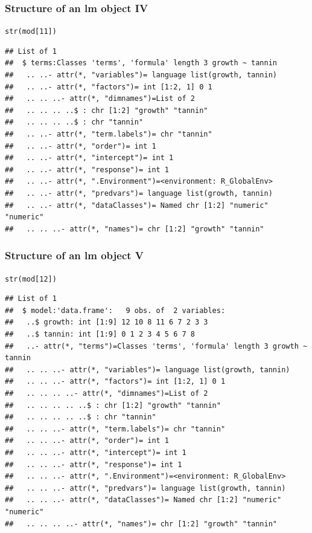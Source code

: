 \documentclass[xcolor=table, xcolor=dvipsnames]{beamer}\usepackage[]{graphicx}\usepackage[]{color}
\makeatletter
\newcommand{\hlnum}[1]{\textcolor[rgb]{0,0,0}{#1}}
\newcommand{\hlstd}[1]{\textcolor[rgb]{0,0,0}{#1}}
\newcommand{\hlkwd}[1]{\textcolor[rgb]{0,0,1}{#1}}
\newenvironment{kframe}{%
 \def\at@end@of@kframe{}%
 \ifinner\ifhmode%
  \def\at@end@of@kframe{\end{minipage}}%
  \begin{minipage}{\columnwidth}%
 \fi\fi%
 \def\FrameCommand##1{\hskip\@totalleftmargin \hskip-\fboxsep
 \colorbox{shadecolor}{##1}\hskip-\fboxsep
     \hskip-\linewidth \hskip-\@totalleftmargin \hskip\columnwidth}%
 \MakeFramed {\advance\hsize-\width
   \@totalleftmargin\z@ \linewidth\hsize
   \@setminipage}}%
 {\par\unskip\endMakeFramed%
 \at@end@of@kframe}
\newenvironment{knitrout}{}{} %
\makeatother
\begin{document}

\begin{frame}[fragile]\frametitle{Structure of an lm object IV}
\begin{knitrout}\scriptsize
{}\color{fgcolor}\begin{kframe}
\begin{alltt}
\hlkwd{str}\hlstd{(mod[}\hlnum{11}\hlstd{])}
\end{alltt}
\begin{verbatim}
## List of 1
##  $ terms:Classes 'terms', 'formula' length 3 growth ~ tannin
##   .. ..- attr(*, "variables")= language list(growth, tannin)
##   .. ..- attr(*, "factors")= int [1:2, 1] 0 1
##   .. .. ..- attr(*, "dimnames")=List of 2
##   .. .. .. ..$ : chr [1:2] "growth" "tannin"
##   .. .. .. ..$ : chr "tannin"
##   .. ..- attr(*, "term.labels")= chr "tannin"
##   .. ..- attr(*, "order")= int 1
##   .. ..- attr(*, "intercept")= int 1
##   .. ..- attr(*, "response")= int 1
##   .. ..- attr(*, ".Environment")=<environment: R_GlobalEnv> 
##   .. ..- attr(*, "predvars")= language list(growth, tannin)
##   .. ..- attr(*, "dataClasses")= Named chr [1:2] "numeric" "numeric"
##   .. .. ..- attr(*, "names")= chr [1:2] "growth" "tannin"
\end{verbatim}
\end{kframe}
\end{knitrout}
\end{frame}


\begin{frame}[fragile]\frametitle{Structure of an lm object V}
\begin{knitrout}\scriptsize
{}\color{fgcolor}\begin{kframe}
\begin{alltt}
\hlkwd{str}\hlstd{(mod[}\hlnum{12}\hlstd{])}
\end{alltt}
\begin{verbatim}
## List of 1
##  $ model:'data.frame':	9 obs. of  2 variables:
##   ..$ growth: int [1:9] 12 10 8 11 6 7 2 3 3
##   ..$ tannin: int [1:9] 0 1 2 3 4 5 6 7 8
##   ..- attr(*, "terms")=Classes 'terms', 'formula' length 3 growth ~ tannin
##   .. .. ..- attr(*, "variables")= language list(growth, tannin)
##   .. .. ..- attr(*, "factors")= int [1:2, 1] 0 1
##   .. .. .. ..- attr(*, "dimnames")=List of 2
##   .. .. .. .. ..$ : chr [1:2] "growth" "tannin"
##   .. .. .. .. ..$ : chr "tannin"
##   .. .. ..- attr(*, "term.labels")= chr "tannin"
##   .. .. ..- attr(*, "order")= int 1
##   .. .. ..- attr(*, "intercept")= int 1
##   .. .. ..- attr(*, "response")= int 1
##   .. .. ..- attr(*, ".Environment")=<environment: R_GlobalEnv> 
##   .. .. ..- attr(*, "predvars")= language list(growth, tannin)
##   .. .. ..- attr(*, "dataClasses")= Named chr [1:2] "numeric" "numeric"
##   .. .. .. ..- attr(*, "names")= chr [1:2] "growth" "tannin"
\end{verbatim}
\end{kframe}
\end{knitrout}
\end{frame}
\end{document}

